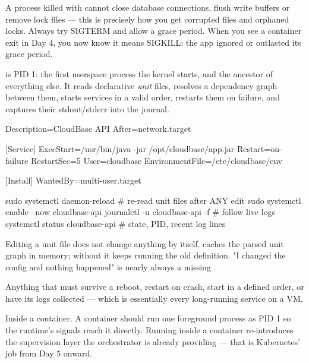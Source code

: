 \begin{reliability}
A process killed with  cannot close database connections, flush write buffers or remove lock files --- this is precisely how you get corrupted files and orphaned locks. Always try SIGTERM and allow a grace period. When you see a container exit  in Day 4, you now know it means SIGKILL: the app ignored or outlasted its grace period.
\end{reliability}

  is PID 1: the first userspace process the kernel starts, and the ancestor of everything else. It reads declarative \emph{unit} files, resolves a dependency graph between them, starts services in a valid order, restarts them on failure, and captures their stdout/stderr into the journal.

\begin{propsbox}
Description=CloudBase API
After=network.target

[Service]
ExecStart=/usr/bin/java -jar /opt/cloudbase/app.jar
Restart=on-failure
RestartSec=5
User=cloudbase
EnvironmentFile=/etc/cloudbase/env

[Install]
WantedBy=multi-user.target
\end{propsbox}

\begin{bashbox}
sudo systemctl daemon-reload        # re-read unit files after ANY edit
sudo systemctl enable --now cloudbase-api
journalctl -u cloudbase-api -f      # follow live logs
systemctl status cloudbase-api      # state, PID, recent log lines
\end{bashbox}

\begin{misconception}
Editing a unit file does not change anything by itself.  caches the parsed unit graph in memory; without  it keeps running the old definition. "I changed the config and nothing happened" is nearly always a missing .
\end{misconception}

 Anything that must survive a reboot, restart on crash, start in a defined order, or have its logs collected --- which is essentially every long-running service on a VM.

 Inside a container. A container should run one foreground process as PID 1 so the runtime's signals reach it directly. Running  inside a container re-introduces the supervision layer the orchestrator is already providing --- that is Kubernetes' job from Day 5 onward.

